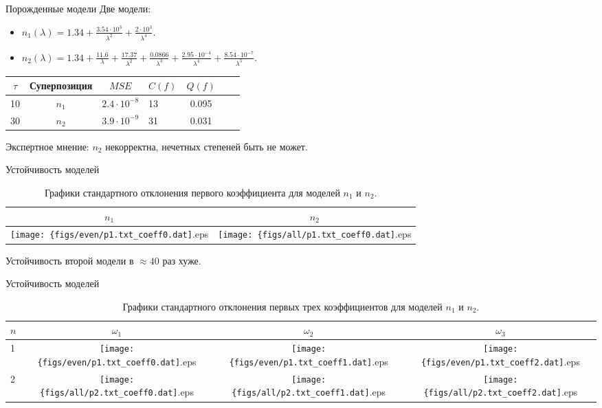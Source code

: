 \documentclass{beamer}
\begin{document}
\begin{frame}{Порожденные модели}
  Две модели:
  \begin{itemize}
    \item $n_1(\lambda) = 1.34 + \frac{3.54 \cdot 10^3}{\lambda^2} + \frac{2 \cdot 10^3}{\lambda^4}$.
    \item $n_2(\lambda) = 1.34 + \frac{11.6}{\lambda} + \frac{17.37}{\lambda^2} + \frac{0.0866}{\lambda^3} + \frac{2.95 \cdot 10^{-4}}{\lambda^4} + \frac{8.54 \cdot 10^{-7}}{\lambda^5}.$
  \end{itemize}
  
  \begin{table}[h]
    \centering
    \begin{tabular}{| c | c | c | l | c | c | c |} \hline
  	$\tau$	& Суперпозиция		& $MSE$					& $C(f)$		& $Q(f)$ \\ \hline
	10	  	& $n_1$		  		& $2.4 \cdot 10^{-8}$	& 13			& 0.095	\\ \hline
	30		& $n_2$				& $3.9 \cdot 10^{-9}$	& 31			& 0.031	\\ \hline
    \end{tabular}
  \end{table}
  
  Экспертное мнение: $n_2$ некорректна, нечетных степеней быть не может.
\end{frame}

\begin{frame}{Устойчивость моделей}
\begin{table}[h]
    \centering
    \begin{tabular}{c | c}
	  $n_1$ & $n_2$ \\ \hline
	  \texttt{[image: \{figs/even/p1.txt\_coeff0.dat]}.eps} & \texttt{[image: \{figs/all/p1.txt\_coeff0.dat]}.eps} \\
    \end{tabular}
    \caption{Графики стандартного отклонения первого коэффициента для моделей $n_1$ и $n_2$.}
  \end{table}
  
  Устойчивость второй модели в $\approx 40$ раз хуже.
\end{frame}

\begin{frame}{Устойчивость моделей}
\begin{table}[h]
    \centering
    \begin{tabular}{l | c c c}
	  $n$ & $\omega_1$ & $\omega_2$ & $\omega_3$ \\ \hline
	  1 & \texttt{[image: \{figs/even/p1.txt\_coeff0.dat]}.eps} & \texttt{[image: \{figs/even/p1.txt\_coeff1.dat]}.eps} & \texttt{[image: \{figs/even/p1.txt\_coeff2.dat]}.eps} \\
	  2 & \texttt{[image: \{figs/all/p2.txt\_coeff0.dat]}.eps} & \texttt{[image: \{figs/all/p2.txt\_coeff1.dat]}.eps} & \texttt{[image: \{figs/all/p2.txt\_coeff2.dat]}.eps}
    \end{tabular}
    \caption{Графики стандартного отклонения первых трех коэффициентов для моделей $n_1$ и $n_2$.}
  \end{table}
\end{frame}
\end{document}
